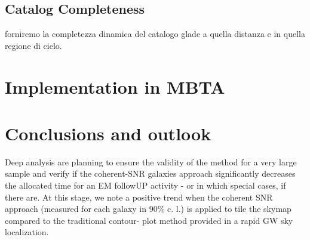 \documentclass[aps, prd, twocolumn, superscriptaddress, nofootinbib]{revtex4-1}
\begin{document}
\subsection{Catalog Completeness}
forniremo la completezza dinamica del catalogo glade a quella distanza e in quella regione di cielo.



\section{Implementation in MBTA}

\section{Conclusions and outlook}
Deep analysis are planning to ensure the validity of the method for a very large sample and verify if the coherent-SNR galaxies approach significantly decreases the allocated time for an EM followUP activity - or in which special cases, if there are.
At this stage, we note a positive trend when the coherent SNR approach (measured for each galaxy in 90\% c. l.) is applied to tile the skymap compared to the traditional contour- plot method provided in a rapid GW sky localization.
\end{document}

